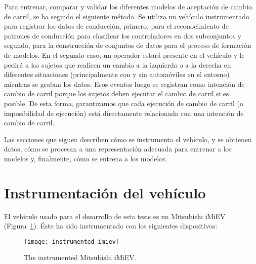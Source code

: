 Para entrenar, comparar y validar los diferentes modelos de aceptación de cambio de carril, se ha seguido el siguiente método. Se utiliza un vehículo instrumentado para registrar los datos de conducción, primero, para el reconocimiento de patrones de conducción para clasificar los controladores en dos subconjuntos y segundo, para la construcción de conjuntos de datos para el proceso de formación de modelos. En el segundo caso, un operador estará presente en el vehículo y le pedirá a los sujetos que realicen un cambio a la izquierda o a la derecha en diferentes situaciones (principalmente con y sin automóviles en el entorno) mientras se graban los datos. Esos eventos luego se registran como intención de cambio de carril porque los sujetos deben ejecutar el cambio de carril si es posible. De esta forma, garantizamos que cada ejecución de cambio de carril (o imposibilidad de ejecución) está directamente relacionada con una intención de cambio de carril.

Las secciones que siguen describen cómo se instrumenta el vehículo, y se obtienen datos, cómo se procesan a una representación adecuada para entrenar a los modelos y, finalmente, cómo se entrena a los modelos.

\section{Instrumentación del vehículo}

El vehiculo usado para el desarrollo de esta tesis es un Mitsubishi iMiEV (Figura~\ref{fig:instrumented-imiev}). Éste ha sido instrumentado con los siguientes dispositivos:

\begin{figure}
	\texttt{[image: instrumented-imiev]}
	\caption{The instrumented Mitsubishi iMiEV.}
	\label{fig:instrumented-imiev}
\end{figure}

